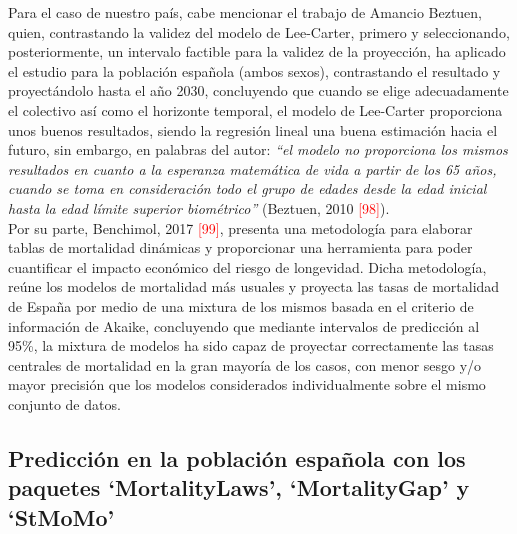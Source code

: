 Para el caso de nuestro país, cabe mencionar el trabajo de Amancio Beztuen, quien, contrastando la validez del modelo de Lee-Carter, primero y seleccionando, posteriormente, un intervalo factible para la validez de la proyección, ha aplicado el estudio para la población española (ambos sexos), contrastando el resultado y proyectándolo hasta el año 2030, concluyendo que cuando se elige adecuadamente el colectivo así como el horizonte temporal, el modelo de Lee-Carter proporciona unos buenos resultados, siendo la regresión lineal una buena estimación hacia el futuro, sin embargo, en palabras del autor: \textit{``el modelo no proporciona los mismos resultados en cuanto a la esperanza matem\'atica de vida a partir de los 65 a\~nos, cuando se toma en consideración todo el grupo de edades desde la edad inicial hasta la edad l\'imite superior biom\'etrico''} (Beztuen, 2010 \textcolor{red}{[98]}).\\

Por su parte, Benchimol, 2017 \textcolor{red}{[99]}, presenta una metodología para elaborar tablas de mortalidad dinámicas y proporcionar una herramienta para poder cuantificar el impacto económico del riesgo de longevidad. Dicha metodología, reúne los modelos de mortalidad más usuales y proyecta las tasas de mortalidad de España por medio de una mixtura de los mismos basada en el criterio de información de Akaike, concluyendo que mediante intervalos de predicción al 95\%, la mixtura de modelos ha sido capaz de proyectar correctamente las tasas centrales de mortalidad en la gran mayoría de los casos, con menor sesgo y/o mayor precisión que los modelos considerados individualmente sobre el mismo conjunto de datos.


\subsection{Predicción en la poblaci\'on espa\~nola con los paquetes `MortalityLaws', `MortalityGap' y `StMoMo'}

